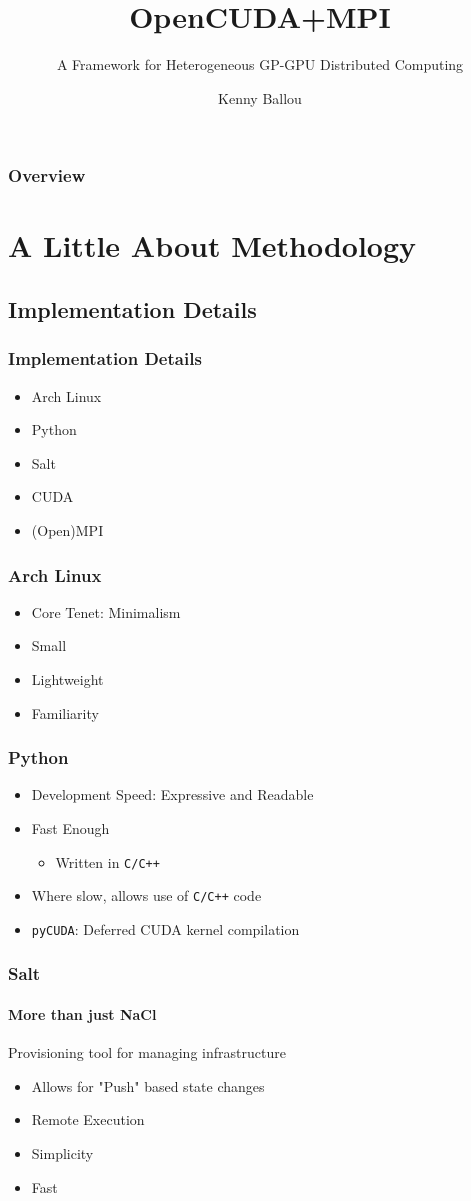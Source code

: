 \documentclass{beamer}
\title{OpenCUDA+MPI}
\subtitle{A Framework for Heterogeneous GP-GPU Distributed Computing}
\author[Ballou]{Kenny Ballou}
\begin{document}
\begin{frame}[label=titleslide]
\titlepage
\end{frame}
\begin{frame}
\frametitle{Overview}
\tableofcontents
\end{frame}
\section{A Little About Methodology}
\begin{frame}
\tableofcontents[currentsection]
\end{frame}
\subsection{Implementation Details}
\begin{frame}
\frametitle{Implementation Details}
\begin{itemize}
\item{Arch Linux}
\item{Python}
\item{Salt}
\item{CUDA}
\item{(Open)MPI}
\end{itemize}
\end{frame}
\begin{frame}
\frametitle{Arch Linux}
\begin{itemize}
\item{Core Tenet: Minimalism}
\item{Small}
\item{Lightweight}
\item{Familiarity}
\end{itemize}
\end{frame}
\begin{frame}
\frametitle{Python}
\begin{itemize}
\item{Development Speed: Expressive and Readable}
\item{Fast Enough}
\begin{itemize}
\item{Written in \texttt{C/C++}}
\end{itemize}
\item{Where slow, allows use of \texttt{C/C++} code}
\item{\texttt{pyCUDA}: Deferred CUDA kernel compilation}
\end{itemize}
\end{frame}
\begin{frame}
\frametitle{Salt}
\framesubtitle{More than just NaCl}
Provisioning tool for managing infrastructure
\begin{itemize}
\item{Allows for "Push" based state changes}
\item{Remote Execution}
\item{Simplicity}
\item{Fast}
\end{itemize}
\end{frame}
\end{document}
